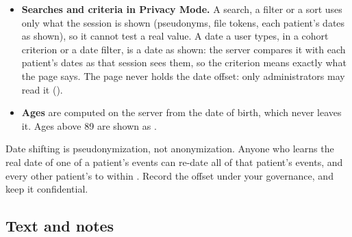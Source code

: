 \begin{itemize}
  about a century, so a misread date shows no real date. A Unix time written on its own is a
  number, and is kept.
\item \textbf{Searches and criteria in Privacy Mode.} A search, a filter or a sort uses only what
  the session is shown (pseudonyms, file tokens, each patient's dates as shown), so it cannot test
  a real value. A date a user types, in a cohort criterion or a date filter, is a date as shown:
  the server compares it with each patient's dates as that session sees them, so the criterion
  means exactly what the page says. The page never holds the date offset: only administrators
  may read it ().
\item \textbf{Ages} are computed on the server from the date of birth, which never leaves it.
  Ages above 89 are shown as .
\end{itemize}

\begin{note}
Date shifting is pseudonymization, not anonymization. Anyone who learns the real date of one of a
patient's events can re-date all of that patient's events, and every other patient's to within
. Record the offset under your governance, and keep it confidential.
\end{note}

\subsection{Text and notes}
\label{sec:protecting-notes}


